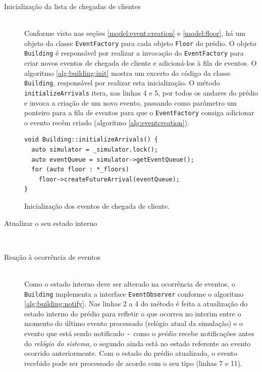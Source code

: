 \begin{description}
  \item[Inicialização da lista de chegadas de clientes] \hfill \\
    Conforme visto nas seções \ref{model:event:creation} e \ref{model:floor}, há
    um objeto da classe \texttt{EventFactory} para cada objeto \texttt{Floor} do
    prédio. O objeto \texttt{Building} é responsável por realizar a invocação do
    \texttt{EventFactory} para criar novos eventos de chegada de cliente e
    adicioná-los à fila de eventos. O algoritmo \ref{alg:building:init} mostra
    um excerto do código da classe \texttt{Building}, responsável por realizar
    esta inicialização. O método \texttt{initializeArrivals} itera, nas linhas 4
    e 5, por todos os andares do prédio e invoca a criação de um novo evento,
    passando como parâmetro um ponteiro para a fila de eventos para que o
    \texttt{EventFactory} consiga adicionar o evento recém criado (algoritmo
    \ref{alg:eventcreation}).

    \begin{algorithm}[htb]
      \centering
        \begin{verbatim}
void Building::initializeArrivals() {
  auto simulator = _simulator.lock();
  auto eventQueue = simulator->getEventQueue();
  for (auto floor : *_floors)
    floor->createFutureArrival(eventQueue);
}
        \end{verbatim}
      \caption{Inicialização dos eventos de chegada de cliente.}
      \label{alg:building:init}
    \end{algorithm}

  \item[Atualizar o seu estado interno] \hfill \\

  \item[Reação à ocorrência de eventos] \hfill \\

    Como o estado interno deve ser alterado na ocorrência de eventos, o
    \texttt{Building} implementa a interface \texttt{EventObserver} conforme o
    algoritmo \ref{alg:building:notify}. Nas linhas 2 a 4 do método é feita a
    atualização do estado interno do prédio para refletir o que ocorreu no
    interim entre o momento do último evento processado (relógio atual da
    simulação) e o evento que está sendo notificado~-~como o \textit{prédio}
    recebe notificações antes do \textit{relógio do sistema}, o segundo ainda
    está no estado referente ao evento ocorrido anteriormente. Com o estado do
    prédio atualizado, o evento recebido pode ser processado de acordo com o seu
    tipo (linhas 7 e 11).


\end{description}

